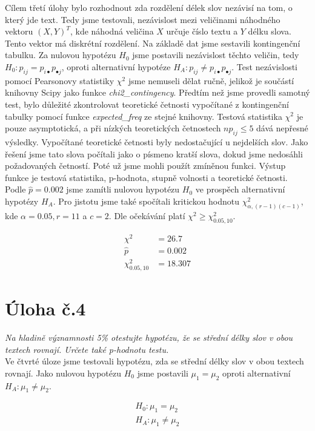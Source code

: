 \documentclass[czech]{mvi-report}
\begin{document}
Cílem třetí úlohy bylo rozhodnout zda rozdělení délek slov nezávisí na tom, o který jde text. Tedy jsme testovali, nezávislost mezi veličinami náhodného vektoru $ (X,Y)^T $, kde náhodná veličina $ X $ určuje číslo textu a $ Y $ délku slova. Tento vektor má diskrétní rozdělení. Na základě dat jsme sestavili kontingenční tabulku. Za nulovou hypotézu $ H_0 $ jsme postavili nezávislost těchto veličin, tedy $ H_0: p_{ij}=p_{i \bullet} p_{\bullet j} $, oproti alternativní hypotéze $ H_A: p_{ij}\neq p_{i \bullet} p_{\bullet j} $. Test nezávislosti pomocí Pearsonovy statistiky $ \chi^2 $ jsme nemuseli dělat ručně, jelikož je součástí knihovny Scipy jako funkce \textit{chi2\_contingency}. Předtím než jsme provedli samotný test, bylo důležité zkontrolovat teoretické četnosti vypočítané z kontingenční tabulky pomocí funkce \textit{expected\_freq} ze stejné knihovny. Testová statistika $ \chi^2 $ je pouze asymptotická, a při nízkých teoretických četnostech $ np_{ij} \leq 5 $ dává nepřesné výsledky. Vypočítané teoretické četnosti byly nedostačující u nejdelších slov. Jako řešení jsme tato slova počítali jako o písmeno kratší slova, dokud jsme nedosáhli požadovaných četností. Poté už jsme mohli použít zmíněnou funkci. Výstup funkce je testová statistika, p-hodnota, stupně volnosti a teoretické četnosti. Podle $ \hat{p} = 0.002 $ jsme zamítli nulovou hypotézu $ H_0 $ ve prospěch alternativní hypotézy $ H_A $. Pro jistotu jsme také spočítali kritickou hodnotu $ \chi^2_{\alpha,(r-1)(c-1)} $, kde $ \alpha = 0.05, r = 11 $ a $ c = 2 $. Dle očekávání platí $ \chi^2 \geq \chi^2_{0.05,10} $.

\begin{align*}
\chi^2 &= 26.7\\
\hat{p} &= 0.002\\
\chi^2_{0.05,10} &= 18.307
\end{align*}

\section{Úloha č.4}
\textit{Na hladině významnosti 5\% otestujte hypotézu, že se střední délky slov v obou textech rovnají. Určete také p-hodnotu testu.}\\

Ve čtvrté úloze jsme testovali hypotézu, zda se střední délky slov v obou textech rovnají. Jako nulovou hypotézu $ H_0 $ jsme postavili $ \mu_1 = \mu_2 $ oproti alternativní $ H_A: \mu_1 \neq \mu_2 $. 

\begin{align*}
H_0: \mu_1 = \mu_2\\
H_A: \mu_1 \neq \mu_2
\end{align*}
\end{document}
